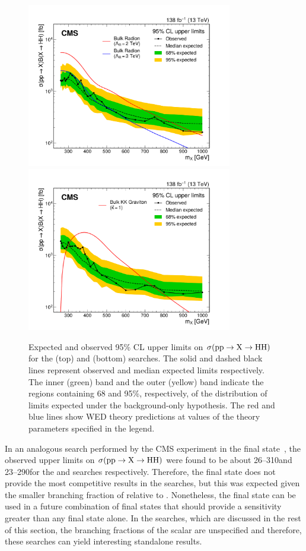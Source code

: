 \begin{figure}
    \centering
    \includegraphics[width=0.8\textwidth]{Figures/Dihiggs/results/limits/limits_radion_paper.pdf}
    \includegraphics[width=0.8\textwidth]{Figures/Dihiggs/results/limits/limits_graviton_paper.pdf}
    \caption[\XHH Upper Limits]{Expected and observed 95\% CL upper limits on $\sigma(\mathrm{p}\mathrm{p} \to \mathrm{X} \to \mathrm{H}\mathrm{H})$ for the \XZeroHH (top) and \XTwoHH (bottom) searches. The solid and dashed black lines represent observed and median expected limits respectively. The inner (green) band and the outer (yellow) band indicate the regions containing 68 and 95\%, respectively, of the distribution of limits expected under the background-only hypothesis. The red and blue lines show WED theory predictions at values of the theory parameters specified in the legend.}\label{fig:limits_xhh}
\end{figure}

In an analogous search performed by the CMS experiment in the \bbgg final state~\cite{CMS:2023boe}, the observed upper limits on $\sigma(\mathrm{p}\mathrm{p} \to \mathrm{X} \to \mathrm{H}\mathrm{H})$ were found to be about 26--310\fb and 23--290\fb for the \XZeroHH and \XTwoHH searches respectively. Therefore, the \ggtt final state does not provide the most competitive results in the \XHH searches, but this was expected given the smaller branching fraction of \Htautau relative to \Hbb. Nonetheless, the \ggtt final state can be used in a future combination of final states that should provide a sensitivity greater than any final state alone. In the \XYH searches, which are discussed in the rest of this section, the branching fractions of the \PY scalar are unspecified and therefore, these searches can yield interesting standalone results. 

